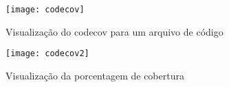 \begin{figure}[h]
    \centering
    \texttt{[image: codecov]}
    \caption{Visualização do codecov para um arquivo de código}
    \label{codecov}
\end{figure}

\begin{figure}[h]
    \centering
    \texttt{[image: codecov2]}
    \caption{Visualização da porcentagem de cobertura}
    \label{codecov2}
\end{figure}

